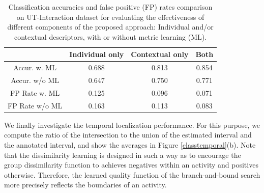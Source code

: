\documentclass[10pt,twocolumn,letterpaper]{article}
\begin{document}
\begin{table}[ht]
\centering \caption{Classification accuracies and false positive (FP) rates comparison on UT-Interaction dataset for evaluating the effectiveness of different components of the proposed approach: Individual and/or contextual descriptors, with or without metric learning (ML).}
\footnotesize{
\begin{tabular}{|c|c|c|c|}
\hline   & Individual only & Contextual only & Both \\
\hline Accur. w. ML & 0.688 & 0.813 & 0.854  \\
\hline Accur. w/o ML & 0.647 & 0.750 & 0.771    \\
\hline FP Rate w. ML &  0.125 & 0.096 & 0.071  \\
\hline FP Rate w/o ML & 0.163 & 0.113 & 0.083\\
\hline 
\end{tabular}
}
\label{UTaccuFPdegrade}
\end{table}


We finally investigate the temporal localization performance. For this purpose, we compute the ratio of the intersection to the union of the estimated interval and the annotated interval, and show the averages in Figure \ref{classtemporal}(b).  Note that the dissimilarity learning is designed in such a way as to encourage the group dissimilarity function to achieves negatives within an activity and positives otherwise. Therefore, the learned quality function of the branch-and-bound search more precisely reflects the boundaries of an activity.
\end{document}
